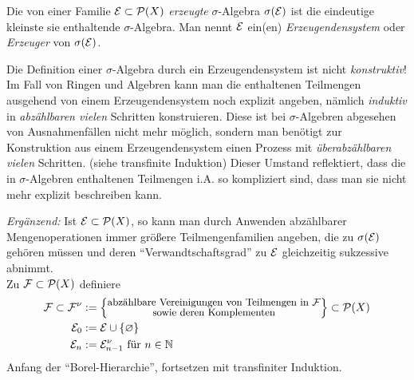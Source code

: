 \begin{definition}
\begin{mdframed}
Die von einer Familie $\mathcal{E}\subset \mathcal{P}(X)$ \emph{erzeugte} $\sigma$-Algebra $\sigma(\mathcal{E})$  ist die eindeutige kleinste sie enthaltende $\sigma$-Algebra. Man nennt $\mathcal{E}$ ein(en) \emph{Erzeugendensystem} oder \emph{Erzeuger} von $\sigma(\mathcal{E})$.
\end{mdframed}
\end{definition}
Die Definition einer $\sigma$-Algebra durch ein Erzeugendensystem ist nicht \emph{konstruktiv}! Im Fall von Ringen und Algebren kann man die enthaltenen Teilmengen ausgehend von einem Erzeugendensystem noch explizit angeben, nämlich \emph{induktiv} in \emph{abzählbaren vielen} Schritten konstruieren. Diese ist bei $\sigma$-Algebren abgesehen von Ausnahmenfällen nicht mehr möglich, sondern man benötigt zur Konstruktion aus einem Erzeugendensystem einen Prozess mit \emph{überabzählbaren vielen} Schritten. (siehe transfinite Induktion) Dieser Umstand reflektiert, dass die in $\sigma$-Algebren enthaltenen Teilmengen i.A. so kompliziert sind, dass man sie nicht mehr explizit beschreiben kann. \newline \newline
\begin{small}
\textit{Ergänzend:} Ist $\mathcal{E}\subset\mathcal{P}(X)$, so kann man durch Anwenden abzählbarer Mengenoperationen immer größere Teilmengenfamilien angeben, die zu $\sigma(\mathcal{E})$ gehören müssen und deren ``Verwandtschaftsgrad'' zu $\mathcal{E}$ gleichzeitig sukzessive abnimmt.\\
Zu $\mathcal{F} \subset \mathcal{P}(X)$ definiere 
\begin{equation*}
\begin{split}
\mathcal{F} \subset \mathcal{F}^\nu & := \left\{
\substack{\text{\small abzählbare Vereinigungen von Teilmengen in $\mathcal{F}$}  \\ \text{\small sowie deren Komplementen}}
\right\} \subset \mathcal{P}(X) 	\\
\mathcal{E}_0 & := \mathcal{E} \cup \{\varnothing\} \\
\mathcal{E}_n & := \mathcal{E}^\nu_{n-1}	\text{ für } n\in \mathbb{N}
\end{split}
\end{equation*}
Anfang der ``Borel-Hierarchie'', fortsetzen mit transfiniter Induktion.
\end{small} 

